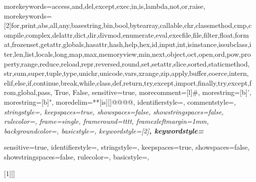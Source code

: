  {
	morekeywords={access,and,del,except,exec,in,is,lambda,not,or,raise},
	morekeywords=[2]{for,print,abs,all,any,basestring,bin,bool,bytearray,callable,chr,classmethod,cmp,compile,complex,delattr,dict,dir,divmod,enumerate,eval,execfile,file,filter,float,format,frozenset,getattr,globals,hasattr,hash,help,hex,id,input,int,isinstance,issubclass,iter,len,list,locals,long,map,max,memoryview,min,next,object,oct,open,ord,pow,property,range,reduce,reload,repr,reversed,round,set,setattr,slice,sorted,staticmethod,str,sum,super,tuple,type,unichr,unicode,vars,xrange,zip,apply,buffer,coerce,intern,elif,else,if,continue,break,while,class,def,return,try,except,import,finally,try,except,from,global,pass, True, False},
	sensitive=true,
	morecomment=[l]\#,%
	morestring=[b]',%
	morestring=[b]",%
	moredelim=**[is][\color{black}]{@@}{@@},
	identifierstyle=\color{black}\footnotesize\ttfamily,
	commentstyle=\color{ipython-cyan}\footnotesize\itshape\ttfamily,
	stringstyle=\color{ipython-red}\footnotesize\ttfamily,
	keepspaces=true,
	showspaces=false,
	showstringspaces=false,
	rulecolor=\color{ipython-frame},
	frame=single,
	frameround={t}{t}{t}{t},
	framexleftmargin=1mm,
	backgroundcolor=\color{ipython-bg},
	basicstyle=\footnotesize\ttfamily,
	keywordstyle=[2]\color{ipython-green}\bfseries\footnotesize\ttfamily, 
	keywordstyle=\color{ipython-purple}\bfseries\footnotesize\ttfamily
}

 {
	sensitive=true,
	identifierstyle=\color{black}\small\ttfamily,
	stringstyle=\color{ipython-red}\small\ttfamily,
	keepspaces=true,
	showspaces=false,
	showstringspaces=false,
	rulecolor=\color{ipython-frame},
	basicstyle=\small\ttfamily,
}



[1][]{
	\lstset{language=iPython,style=attstyle,mathescape=true}
}{%
}

